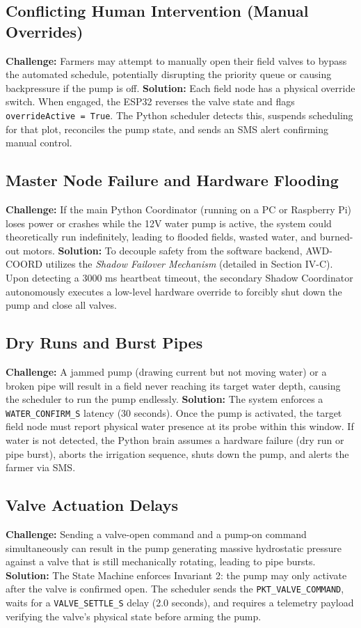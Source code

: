 \documentclass[conference]{IEEEtran}
\begin{document}
\subsection{Conflicting Human Intervention (Manual Overrides)}
\textbf{Challenge:} Farmers may attempt to manually open their field valves to bypass the automated schedule, potentially disrupting the priority queue or causing backpressure if the pump is off.
\textbf{Solution:} Each field node has a physical override switch. When engaged, the ESP32 reverses the valve state and flags \texttt{overrideActive = True}. The Python scheduler detects this, suspends scheduling for that plot, reconciles the pump state, and sends an SMS alert confirming manual control.

\subsection{Master Node Failure and Hardware Flooding}
\textbf{Challenge:} If the main Python Coordinator (running on a PC or Raspberry Pi) loses power or crashes while the 12V water pump is active, the system could theoretically run indefinitely, leading to flooded fields, wasted water, and burned-out motors.
\textbf{Solution:} To decouple safety from the software backend, AWD-COORD utilizes the \textit{Shadow Failover Mechanism} (detailed in Section IV-C). Upon detecting a 3000 ms heartbeat timeout, the secondary Shadow Coordinator autonomously executes a low-level hardware override to forcibly shut down the pump and close all valves.

\subsection{Dry Runs and Burst Pipes}
\textbf{Challenge:} A jammed pump (drawing current but not moving water) or a broken pipe will result in a field never reaching its target water depth, causing the scheduler to run the pump endlessly.
\textbf{Solution:} The system enforces a \texttt{WATER\_CONFIRM\_S} latency (30 seconds). Once the pump is activated, the target field node must report physical water presence at its probe within this window. If water is not detected, the Python brain assumes a hardware failure (dry run or pipe burst), aborts the irrigation sequence, shuts down the pump, and alerts the farmer via SMS.

\subsection{Valve Actuation Delays}
\textbf{Challenge:} Sending a valve-open command and a pump-on command simultaneously can result in the pump generating massive hydrostatic pressure against a valve that is still mechanically rotating, leading to pipe bursts.
\textbf{Solution:} The State Machine enforces Invariant 2: the pump may only activate after the valve is confirmed open. The scheduler sends the \texttt{PKT\_VALVE\_COMMAND}, waits for a \texttt{VALVE\_SETTLE\_S} delay (2.0 seconds), and requires a telemetry payload verifying the valve's physical state before arming the pump.
\end{document}
